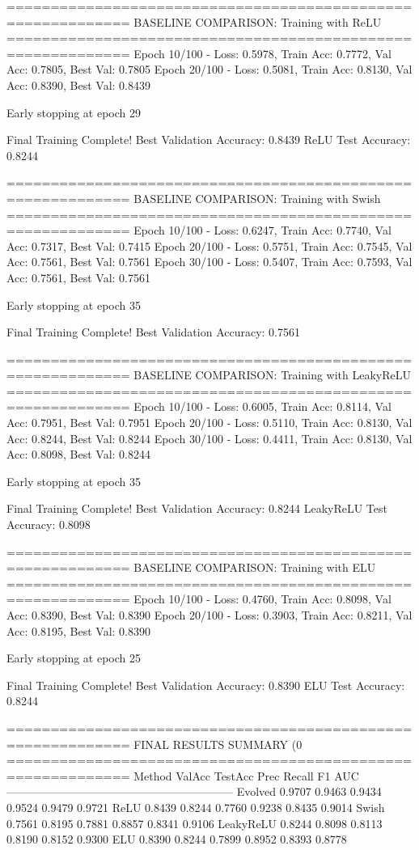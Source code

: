 ============================================================
BASELINE COMPARISON: Training with ReLU
============================================================
Epoch  10/100 - Loss: 0.5978, Train Acc: 0.7772, Val Acc: 0.7805, Best Val: 0.7805
Epoch  20/100 - Loss: 0.5081, Train Acc: 0.8130, Val Acc: 0.8390, Best Val: 0.8439

Early stopping at epoch 29

Final Training Complete!
Best Validation Accuracy: 0.8439
ReLU Test Accuracy: 0.8244

============================================================
BASELINE COMPARISON: Training with Swish
============================================================
Epoch  10/100 - Loss: 0.6247, Train Acc: 0.7740, Val Acc: 0.7317, Best Val: 0.7415
Epoch  20/100 - Loss: 0.5751, Train Acc: 0.7545, Val Acc: 0.7561, Best Val: 0.7561
Epoch  30/100 - Loss: 0.5407, Train Acc: 0.7593, Val Acc: 0.7561, Best Val: 0.7561

Early stopping at epoch 35

Final Training Complete!
Best Validation Accuracy: 0.7561

============================================================
BASELINE COMPARISON: Training with LeakyReLU
============================================================
Epoch  10/100 - Loss: 0.6005, Train Acc: 0.8114, Val Acc: 0.7951, Best Val: 0.7951
Epoch  20/100 - Loss: 0.5110, Train Acc: 0.8130, Val Acc: 0.8244, Best Val: 0.8244
Epoch  30/100 - Loss: 0.4411, Train Acc: 0.8130, Val Acc: 0.8098, Best Val: 0.8244

Early stopping at epoch 35

Final Training Complete!
Best Validation Accuracy: 0.8244
LeakyReLU Test Accuracy: 0.8098

============================================================
BASELINE COMPARISON: Training with ELU
============================================================
Epoch  10/100 - Loss: 0.4760, Train Acc: 0.8098, Val Acc: 0.8390, Best Val: 0.8390
Epoch  20/100 - Loss: 0.3903, Train Acc: 0.8211, Val Acc: 0.8195, Best Val: 0.8390

Early stopping at epoch 25

Final Training Complete!
Best Validation Accuracy: 0.8390
ELU Test Accuracy: 0.8244

============================================================
FINAL RESULTS SUMMARY (0%
============================================================
Method             ValAcc     TestAcc    Prec       Recall     F1         AUC
------------------------------------------------------------
Evolved            0.9707     0.9463     0.9434     0.9524     0.9479     0.9721
ReLU               0.8439     0.8244     0.7760     0.9238     0.8435     0.9014
Swish              0.7561     0.8195     0.7881     0.8857     0.8341     0.9106
LeakyReLU          0.8244     0.8098     0.8113     0.8190     0.8152     0.9300
ELU                0.8390     0.8244     0.7899     0.8952     0.8393     0.8778

